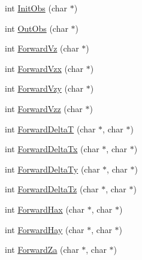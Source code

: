 \begin{DoxyCompactItemize}
int \mbox{\hyperlink{class_g_m3_d_aaff9834c6b6c9f4c245ed954d448750e}{Init\+Obs}} (char $\ast$)
\item 
int \mbox{\hyperlink{class_g_m3_d_a4921121bd02215651d1b103c6f7ce8aa}{Out\+Obs}} (char $\ast$)
\item 
int \mbox{\hyperlink{class_g_m3_d_a22850b3775f11e04af527f63387e750e}{Forward\+Vz}} (char $\ast$)
\item 
int \mbox{\hyperlink{class_g_m3_d_aac2d277383d952d5bc8437c2fcd8cd56}{Forward\+Vzx}} (char $\ast$)
\item 
int \mbox{\hyperlink{class_g_m3_d_a8eb7a4f1981bbccc1a1e6f12dc868228}{Forward\+Vzy}} (char $\ast$)
\item 
int \mbox{\hyperlink{class_g_m3_d_aff475e00f0f6cadb64ecca640e406023}{Forward\+Vzz}} (char $\ast$)
\item 
int \mbox{\hyperlink{class_g_m3_d_a15219677d9903abb90f53b7c6963ee4a}{Forward\+DeltaT}} (char $\ast$, char $\ast$)
\item 
int \mbox{\hyperlink{class_g_m3_d_a0e3cb604502cf6364f6651072f4d74de}{Forward\+Delta\+Tx}} (char $\ast$, char $\ast$)
\item 
int \mbox{\hyperlink{class_g_m3_d_a74b622173016857a6538f2ac525eca65}{Forward\+Delta\+Ty}} (char $\ast$, char $\ast$)
\item 
int \mbox{\hyperlink{class_g_m3_d_a54e8e678674572a08fb25d9baa8b0173}{Forward\+Delta\+Tz}} (char $\ast$, char $\ast$)
\item 
int \mbox{\hyperlink{class_g_m3_d_a333535886227e8bc3e7aa377037b872b}{Forward\+Hax}} (char $\ast$, char $\ast$)
\item 
int \mbox{\hyperlink{class_g_m3_d_a6af0750cb63017973704f70ffd9553d1}{Forward\+Hay}} (char $\ast$, char $\ast$)
\item 
int \mbox{\hyperlink{class_g_m3_d_a7c8346f92a8adeeab38763a2489ce99c}{Forward\+Za}} (char $\ast$, char $\ast$)
\end{DoxyCompactItemize}
